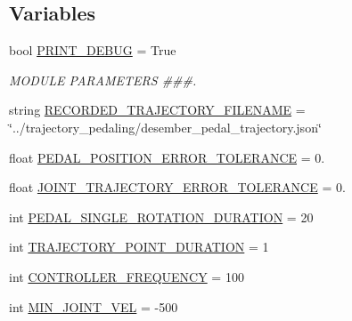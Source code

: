 \subsection*{Variables}
\begin{DoxyCompactItemize}
\item 
bool \mbox{\hyperlink{namespacepedal__simulation__interpolation__linear__trajectory__points_a528355ac4d2635ea23b3d19a0e08fce4}{P\+R\+I\+N\+T\+\_\+\+D\+E\+B\+UG}} = True
\begin{DoxyCompactList}\small\item\em M\+O\+D\+U\+LE P\+A\+R\+A\+M\+E\+T\+E\+RS \#\#\#. \end{DoxyCompactList}\item 
string \mbox{\hyperlink{namespacepedal__simulation__interpolation__linear__trajectory__points_ac8b019fceb68391fd2d5cd1598b0921d}{R\+E\+C\+O\+R\+D\+E\+D\+\_\+\+T\+R\+A\+J\+E\+C\+T\+O\+R\+Y\+\_\+\+F\+I\+L\+E\+N\+A\+ME}} = \char`\"{}../trajectory\+\_\+pedaling/desember\+\_\+pedal\+\_\+trajectory.\+json\char`\"{}
\item 
float \mbox{\hyperlink{namespacepedal__simulation__interpolation__linear__trajectory__points_aebb6bdd4e961ce8277705e205220759b}{P\+E\+D\+A\+L\+\_\+\+P\+O\+S\+I\+T\+I\+O\+N\+\_\+\+E\+R\+R\+O\+R\+\_\+\+T\+O\+L\+E\+R\+A\+N\+CE}} = 0.
\item 
float \mbox{\hyperlink{namespacepedal__simulation__interpolation__linear__trajectory__points_ab397fcf14b760279c017de0a7843c994}{J\+O\+I\+N\+T\+\_\+\+T\+R\+A\+J\+E\+C\+T\+O\+R\+Y\+\_\+\+E\+R\+R\+O\+R\+\_\+\+T\+O\+L\+E\+R\+A\+N\+CE}} = 0.
\item 
int \mbox{\hyperlink{namespacepedal__simulation__interpolation__linear__trajectory__points_a6cb7e7f3aa3bebfa232e54ccdc9ab649}{P\+E\+D\+A\+L\+\_\+\+S\+I\+N\+G\+L\+E\+\_\+\+R\+O\+T\+A\+T\+I\+O\+N\+\_\+\+D\+U\+R\+A\+T\+I\+ON}} = 20
\item 
int \mbox{\hyperlink{namespacepedal__simulation__interpolation__linear__trajectory__points_a1d4e40a9e146872f75e44f9e22cf4a70}{T\+R\+A\+J\+E\+C\+T\+O\+R\+Y\+\_\+\+P\+O\+I\+N\+T\+\_\+\+D\+U\+R\+A\+T\+I\+ON}} = 1
\item 
int \mbox{\hyperlink{namespacepedal__simulation__interpolation__linear__trajectory__points_a605d0bf3d1a8b43a752ddfc76b24360c}{C\+O\+N\+T\+R\+O\+L\+L\+E\+R\+\_\+\+F\+R\+E\+Q\+U\+E\+N\+CY}} = 100
\item 
int \mbox{\hyperlink{namespacepedal__simulation__interpolation__linear__trajectory__points_a7c4ae70fe470e9f12ee15e53722461af}{M\+I\+N\+\_\+\+J\+O\+I\+N\+T\+\_\+\+V\+EL}} = -\/500

\end{DoxyCompactItemize}

